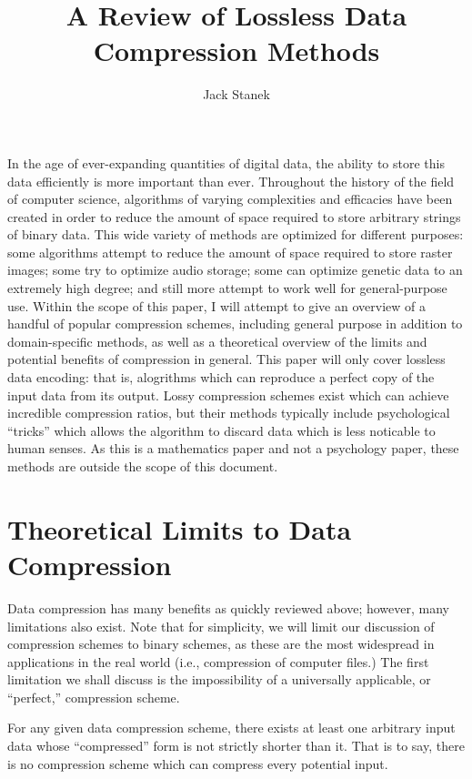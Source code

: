 \documentclass[12pt]{article}
\title{A Review of Lossless Data Compression Methods}
\author{Jack Stanek}
\begin{document}
\maketitle

In the age of ever-expanding quantities of digital data, the ability
to store this data efficiently is more important than ever. Throughout
the history of the field of computer science, algorithms of varying
complexities and efficacies have been created in order to reduce the
amount of space required to store arbitrary strings of binary
data. This wide variety of methods are optimized for different
purposes: some algorithms attempt to reduce the amount of space
required to store raster images; some try to optimize audio storage;
some can optimize genetic data to an extremely high degree; and still
more attempt to work well for general-purpose use. Within the scope of
this paper, I will attempt to give an overview of a handful of popular
compression schemes, including general purpose in addition to
domain-specific methods, as well as a theoretical overview of the
limits and potential benefits of compression in general. This paper
will only cover lossless data encoding: that is, alogrithms which can
reproduce a perfect copy of the input data from its output. Lossy
compression schemes exist which can achieve incredible compression
ratios, but their methods typically include psychological ``tricks''
which allows the algorithm to discard data which is less noticable to
human senses. As this is a mathematics paper and not a psychology
paper, these methods are outside the scope of this document.

\section{Theoretical Limits to Data Compression}

Data compression has many benefits as quickly reviewed above; however,
many limitations also exist. Note that for simplicity, we will limit
our discussion of compression schemes to binary schemes, as these are
the most widespread in applications in the real world (i.e.,
compression of computer files.) The first limitation we shall discuss
is the impossibility of a universally applicable, or ``perfect,''
compression scheme.

\begin{Theorem}
  \label{imperfect-compression}
  For any given data compression scheme, there exists at least one
  arbitrary input data whose ``compressed'' form is not strictly
  shorter than it. That is to say, there is no compression scheme
  which can compress every potential input.
\end{Theorem}
\end{document}
